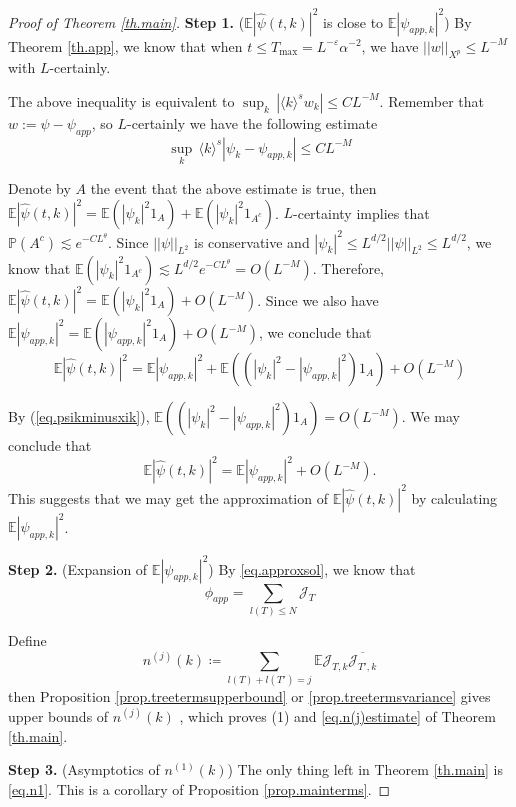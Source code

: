 \begin{proof}[Proof of Theorem \ref{th.main}] \textbf{Step 1.} ($\mathbb E |\widehat \psi(t, k)|^2$ is close to $\mathbb E |\psi_{app,k}|^2$) By Theorem \ref{th.app}, we know that when $t\le T_{\text{max}}= L^{-\varepsilon}\alpha^{-2}$, we have $||w||_{X^p}\le L^{-M}$ with $L$-certainly. 


The above inequality is equivalent to $\sup_k\, |\langle k \rangle^s w_k|\le CL^{-M}$. Remember that $w:=\psi-\psi_{app}$, so $L$-certainly we have the following estimate
\begin{equation}\label{eq.psikminusxik}
    \sup_k\, \langle k \rangle^s |\psi_k-\psi_{app,k}|\le CL^{-M}
\end{equation}

Denote by $A$ the event that the above estimate is true, then $\mathbb E |\widehat \psi(t, k)|^2=\mathbb E (|\psi_k|^2 1_{A})+\mathbb E (|\psi_k|^2 1_{A^c})$. $L$-certainty implies that $\mathbb P(A^c) \lesssim e^{-CL^{\theta}}$. Since $||\psi||_{L^2}$ is conservative and $|\psi_k|^2\le L^{d/2} ||\psi||_{L^2}\le L^{d/2}$, we know that $\mathbb E (|\psi_k|^2 1_{A^c})\lesssim L^{d/2} e^{-CL^{\theta}}= O(L^{-M})$. Therefore, $\mathbb E |\widehat \psi(t, k)|^2=\mathbb E (|\psi_k|^2 1_{A})+O(L^{-M})$. Since we also have $\mathbb E |\psi_{app,k}|^2=\mathbb E (|\psi_{app,k}|^2 1_{A})+O(L^{-M})$, we conclude that
\begin{equation}
    \mathbb E |\widehat \psi(t, k)|^2=\mathbb E |\psi_{app,k}|^2+\mathbb E ((|\psi_k|^2-|\psi_{app,k}|^2)1_{A})+O(L^{-M})
\end{equation}

By (\ref{eq.psikminusxik}), $\mathbb E ((|\psi_k|^2-|\psi_{app,k}|^2)1_{A})=O(L^{-M})$. We may conclude that 
\begin{equation}
    \mathbb E |\widehat \psi(t, k)|^2=\mathbb E |\psi_{app,k}|^2+O(L^{-M}).
\end{equation}
This suggests that we may get the approximation of $\mathbb E |\widehat \psi(t, k)|^2$ by calculating $\mathbb E |\psi_{app,k}|^2$.

\textbf{Step 2.} (Expansion of $\mathbb E |\psi_{app,k}|^2$)
By \eqref{eq.approxsol}, we know that 
\begin{equation}
    \phi_{app}=\sum_{l(T)\le N} \mathcal{J}_T
\end{equation}

Define 
\begin{equation}\label{eq.n(j)}
    n^{(j)}(k)\coloneq \sum_{l(T)+l(T')=j} \mathbb E \mathcal{J}_{T,k}\overline{\mathcal{J}_{T',k}}
\end{equation}
then Proposition \ref{prop.treetermsupperbound} or \ref{prop.treetermsvariance} gives upper bounds of $n^{(j)}(k)$ , which proves (1) and \eqref{eq.n(j)estimate} of Theorem \ref{th.main}.


\textbf{Step 3.} (Asymptotics of $n^{(1)}(k)$) The only thing left in Theorem \ref{th.main} is \eqref{eq.n1}. This is a corollary of Proposition \ref{prop.mainterms}.
\end{proof}
